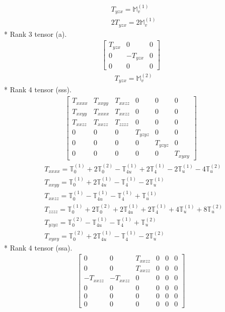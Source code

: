 \documentclass[fleqn,8pt,landscape]{jsarticle}
\begin{document}
\begin{align*}
& T_{yzx} = \mathbb{M}_{v}^{(1)} \\
& 2 T_{yzx} = 2 \mathbb{M}_{v}^{(1)}
\end{align*}
* Rank 3 tensor (a).
\begin{align*}
\begin{bmatrix} T_{yzx} & 0 & 0 \\ 0 & - T_{yzx} & 0 \\ 0 & 0 & 0 \end{bmatrix}
\end{align*}
\begin{align*}
& T_{yzx} = \mathbb{M}_{v}^{(2)}
\end{align*}
* Rank 4 tensor (sss).
\begin{align*}
\begin{bmatrix} T_{xxxx} & T_{xxyy} & T_{xxzz} & 0 & 0 & 0 \\ T_{xxyy} & T_{xxxx} & T_{xxzz} & 0 & 0 & 0 \\ T_{xxzz} & T_{xxzz} & T_{zzzz} & 0 & 0 & 0 \\ 0 & 0 & 0 & T_{yzyz} & 0 & 0 \\ 0 & 0 & 0 & 0 & T_{yzyz} & 0 \\ 0 & 0 & 0 & 0 & 0 & T_{xyxy} \end{bmatrix}
\end{align*}
\begin{align*}
& T_{xxxx} = \mathbb{T}_{0}^{(1)} + 2 \mathbb{T}_{0}^{(2)} - \mathbb{T}_{4u}^{(1)} + 2 \mathbb{T}_{4}^{(1)} - 2 \mathbb{T}_{u}^{(1)} - 4 \mathbb{T}_{u}^{(2)} \\
& T_{xxyy} = \mathbb{T}_{0}^{(1)} + 2 \mathbb{T}_{4u}^{(1)} - \mathbb{T}_{4}^{(1)} - 2 \mathbb{T}_{u}^{(1)} \\
& T_{xxzz} = \mathbb{T}_{0}^{(1)} - \mathbb{T}_{4u}^{(1)} - \mathbb{T}_{4}^{(1)} + \mathbb{T}_{u}^{(1)} \\
& T_{zzzz} = \mathbb{T}_{0}^{(1)} + 2 \mathbb{T}_{0}^{(2)} + 2 \mathbb{T}_{4u}^{(1)} + 2 \mathbb{T}_{4}^{(1)} + 4 \mathbb{T}_{u}^{(1)} + 8 \mathbb{T}_{u}^{(2)} \\
& T_{yzyz} = \mathbb{T}_{0}^{(2)} - \mathbb{T}_{4u}^{(1)} - \mathbb{T}_{4}^{(1)} + \mathbb{T}_{u}^{(2)} \\
& T_{xyxy} = \mathbb{T}_{0}^{(2)} + 2 \mathbb{T}_{4u}^{(1)} - \mathbb{T}_{4}^{(1)} - 2 \mathbb{T}_{u}^{(2)}
\end{align*}
* Rank 4 tensor (ssa).
\begin{align*}
\begin{bmatrix} 0 & 0 & T_{xxzz} & 0 & 0 & 0 \\ 0 & 0 & T_{xxzz} & 0 & 0 & 0 \\ - T_{xxzz} & - T_{xxzz} & 0 & 0 & 0 & 0 \\ 0 & 0 & 0 & 0 & 0 & 0 \\ 0 & 0 & 0 & 0 & 0 & 0 \\ 0 & 0 & 0 & 0 & 0 & 0 \end{bmatrix}
\end{align*}
\end{document}
